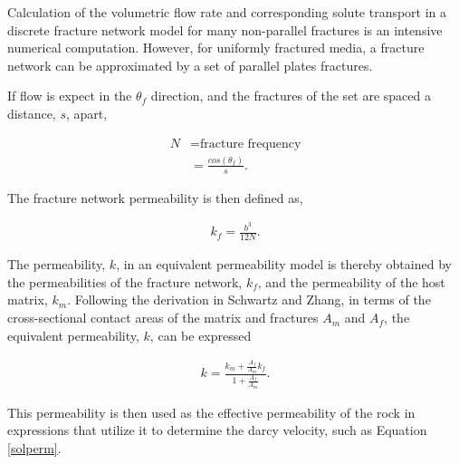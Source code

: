 {Calculation of the volumetric flow rate and corresponding solute transport in a
discrete fracture network model for many non-parallel fractures is an intensive
numerical computation. However, for uniformly fractured media, a fracture
network can be approximated by a set of parallel plates fractures. 

If flow is expect in the $\theta_f$ direction, and the fractures of the set are
spaced a distance, $s$, apart,

\begin{align} 
  N &= \mbox{fracture frequency}\nonumber\\ 
  &= \frac{cos(\theta_f)}{s}.  
  \label{fracfreq} 
\end{align}

The fracture network permeability is then defined as, 

\begin{align} 
  k_f =
\frac{b^3}{12N}.  
\label{fracperm} 
\end{align}

The permeability, $k$, in an equivalent permeability model is thereby obtained
by the permeabilities of the fracture network, $k_f$, and the permeability of
the host matrix, $k_m$. Following the derivation in Schwartz and Zhang, in
terms of the cross-sectional contact areas of the matrix and fractures $A_m$
and $A_f$, the equivalent permeability, $k$, can be expressed

\begin{align} 
  k = \frac{k_m + \frac{A_f}{A_m}k_f}{1+\frac{A_f}{A_m}}.
  \label{equivperm} 
\end{align}

This permeability is then used as the effective permeability of the rock in 
expressions that utilize it to determine the darcy velocity, such as Equation 
\eqref{solperm}.





}
